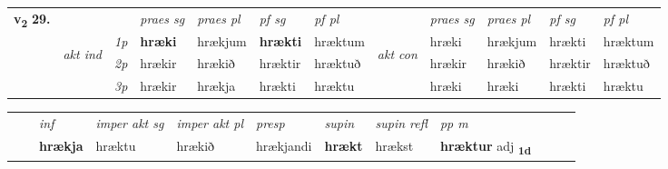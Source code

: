 \begin{tabular}{llllllllllll} \toprule
\multirow{4}{*}{{{\textbf{v{\textsubscript{2}}} \Large{\textbf{29.}}}}}  & &   &  \textit{praes sg}  & \textit{praes pl}  &\textit{ pf sg} & \textit{pf pl} &  &  \textit{praes sg}  & \textit{praes pl}  & \textit{pf sg} & \textit{pf pl } \\*
	\cmidrule{4-7} \cmidrule{9-12}
 & \multirow{3}{*}{\begin{turn}{90}\textit{akt ind}\end{turn}} & {\textit{1p}} & \textbf{hræki} & hrækjum    & \textbf{hrækti} & hræktum & \multirow{3}{*}{\begin{turn}{90}\textit{akt con}\end{turn}} &hræki & hrækjum & hrækti & hræktum\\*
& &  {\textit{2p}} &  hrækir  & hrækið   & hræktir & hræktuð & & hrækir & hrækið & hræktir & hræktuð \\*
& &  {\textit{3p}} & hrækir & hrækja   & hrækti & hræktu & & hræki & hræki& hrækti & hræktu  \\*
\cmidrule{4-7} \cmidrule{9-12}
\end{tabular}


\begin{tabular}{llllllllllll}
 & & \textit{inf} & \textit{imper akt sg} & \textit{imper akt pl}   & \textit{presp} & \textit{supin} & \textit{supin refl} & \textit{pp m}     \\*
  & & \textbf{hrækja} & hræktu  & hrækið   & hrækjandi &  \textbf{hrækt} & hrækst & \textbf{hræktur} adj \textbf{\textsubscript{1d}} \\*
\cmidrule{1-12}
\end{tabular}



